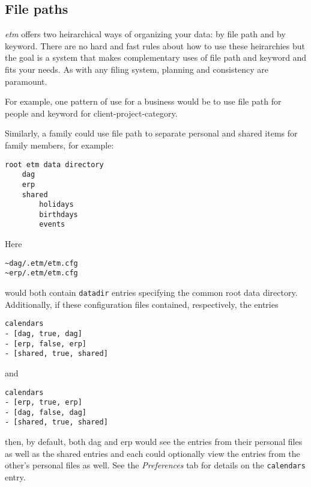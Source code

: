 \documentclass[]{article}
\begin{document}
\subsection{File paths}

\emph{etm} offers two heirarchical ways of organizing your data: by file
path and by keyword. There are no hard and fast rules about how to use
these heirarchies but the goal is a system that makes complementary uses
of file path and keyword and fits your needs. As with any filing system,
planning and consistency are paramount.

For example, one pattern of use for a business would be to use file path
for people and keyword for client-project-category.

Similarly, a family could use file path to separate personal and shared
items for family members, for example:

\begin{verbatim}
root etm data directory
    dag
    erp
    shared
        holidays
        birthdays
        events
\end{verbatim}

Here

\begin{verbatim}
~dag/.etm/etm.cfg
~erp/.etm/etm.cfg
\end{verbatim}

would both contain \texttt{datadir} entries specifying the common root
data directory. Additionally, if these configuration files contained,
respectively, the entries

\begin{verbatim}
calendars
- [dag, true, dag]
- [erp, false, erp]
- [shared, true, shared]
\end{verbatim}

and

\begin{verbatim}
calendars
- [erp, true, erp]
- [dag, false, dag]
- [shared, true, shared]
\end{verbatim}

then, by default, both dag and erp would see the entries from their
personal files as well as the shared entries and each could optionally
view the entries from the other's personal files as well. See the
\emph{Preferences} tab for details on the \texttt{calendars} entry.
\end{document}
